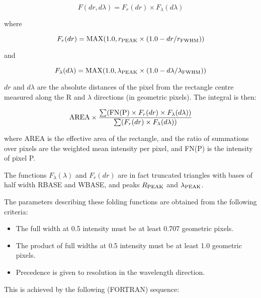 \begin{displaymath}
F(dr, d\lambda) = F_{r}(dr) \times F_{\lambda}(d\lambda)
\end{displaymath}

where

\begin{displaymath}
F_{r}(dr) = {\rm MAX}(1.0, r_{\rm PEAK} \times
            (1.0 - dr / r_{\rm FWHM}))
\end{displaymath}

and

\begin{displaymath}
F_{\lambda}(d\lambda) = {\rm MAX}(1.0, \lambda_{\rm PEAK} \times
(1.0 - d\lambda / \lambda_{\rm FWHM}))
\end{displaymath}

$dr$ and $d\lambda$ are the absolute distances of the pixel from the rectangle
centre measured along the R and $\lambda$ directions (in geometric pixels).
The integral is then:

\begin{displaymath}
{\rm AREA} \times \frac {
\sum ( {\rm FN(P)} \times F_{r}(dr) \times F_{\lambda}(d\lambda) )}
{\sum ( F_{r}(dr) \times F_{\lambda}(d\lambda) )}
\end{displaymath}

where AREA is the effective area of the rectangle, and the ratio of summations
over pixels are the weighted mean intensity per pixel, and FN(P) is the
intensity of pixel P\@.

The functions $F_{\lambda}(\lambda)$ and $F_{r}(dr)$ are in fact truncated
triangles with bases of half width RBASE and WBASE, and peaks $R_{\rm PEAK}$
and $\lambda_{\rm PEAK}$\@.

The parameters describing these folding functions are obtained from the
following criteria:

\begin{itemize}

\item The full width at 0.5 intensity must be at least 0.707 geometric pixels.

\item The product of full widths at 0.5 intensity must be at least 1.0
      geometric pixels.

\item Precedence is given to resolution in the wavelength direction.

\end{itemize}

This is achieved by the following (FORTRAN) sequence:

